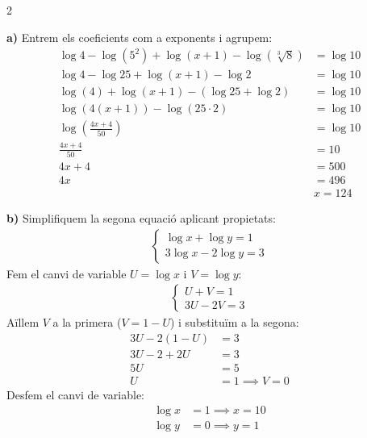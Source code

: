 \documentclass[12pt,a4paper]{exam}
\begin{document}
\begin{questions}
\begin{multicols}{2}
\end{multicols}
\begin{solution}
    \textbf{a)} Entrem els coeficients com a exponents i agrupem:
    \begin{align*}
        \log 4 - \log(5^2) + \log(x+1) - \log(\sqrt[3]{8}) &= \log 10 \\
        \log 4 - \log 25 + \log(x+1) - \log 2 &= \log 10 \\
        \log(4) + \log(x+1) - (\log 25 + \log 2) &= \log 10 \\
        \log(4(x+1)) - \log(25 \cdot 2) &= \log 10 \\
        \log\left(\frac{4x+4}{50}\right) &= \log 10 \\
        \frac{4x+4}{50} &= 10 \\
        4x+4 &= 500 \\
        4x &= 496 \\
        &\boxed{x = 124}
    \end{align*}
    
    \textbf{b)} Simplifiquem la segona equació aplicant propietats:
    \begin{align*}
        \begin{cases} \log x + \log y = 1 \\ 3\log x - 2\log y = 3 \end{cases}
    \end{align*}
    Fem el canvi de variable $U = \log x$ i $V = \log y$:
    \begin{align*}
        \begin{cases} U + V = 1 \\ 3U - 2V = 3 \end{cases}
    \end{align*}
    Aïllem $V$ a la primera ($V = 1 - U$) i substituïm a la segona:
    \begin{align*}
        3U - 2(1 - U) &= 3 \\
        3U - 2 + 2U &= 3 \\
        5U &= 5 \\
        U &= 1 \implies V = 0
    \end{align*}
    Desfem el canvi de variable:
    \begin{align*}
        \log x &= 1 \implies \boxed{x = 10} \\
        \log y &= 0 \implies \boxed{y = 1}
    \end{align*}
\end{solution}


\end{questions}
\end{document}
